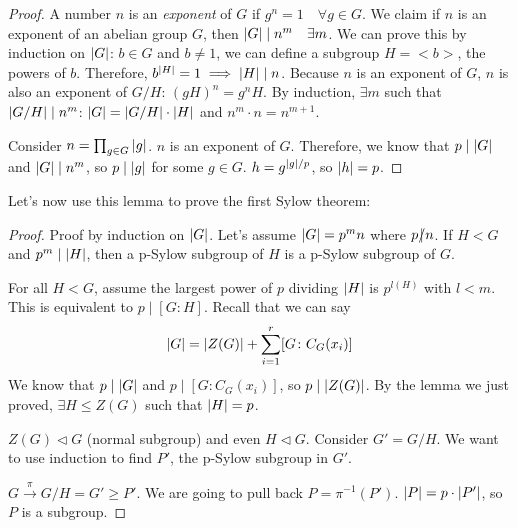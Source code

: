 \documentclass[a4paper,twoside,master.tex]{subfiles}
\begin{document}
\begin{proof}
    A number $ n $ is an \textit{exponent} of $ G $ if $ g^n = 1 \quad\forall g \in G$. We claim if $ n $ is an exponent of an abelian group $ G $, then $ \abs{G} \mid n^m \quad\exists m $. We can prove this by induction on $ \abs{G} $: $ b \in G $ and $ b \neq 1 $, we can define a subgroup $ H = <b> $, the powers of $ b $. Therefore, $ b^{\abs{H}} = 1 \implies \abs{H} \mid n $. Because $ n $ is an exponent of $ G $, $ n $ is also an exponent of $ G/H $: $ (gH)^n = g^n H $. By induction, $ \exists m $ such that $ \abs{G/H} \mid n^m $: $ \abs{G} = \abs{G/H} \cdot \abs{H} $ and $ n^m \cdot n = n^{m+1} $.

    Consider $ n = \prod_{g \in G} \abs{g} $. $ n $ is an exponent of $ G $. Therefore, we know that $ p\mid \abs{G} $ and $ \abs{G} \mid n^m $, so $ p \mid \abs{g} $ for some $ g \in G $. $ h = g^{\abs{g} / p} $, so $ \abs{h} = p $.
\end{proof}

Let's now use this lemma to prove the first Sylow theorem:
\begin{proof}
    Proof by induction on $ \abs{G} $. Let's assume $ \abs{G} = p^m n $ where $ p \slashed{\mid} n $. If $ H < G $ and $ p^m \mid \abs{H} $, then a p-Sylow subgroup of $ H $ is a p-Sylow subgroup of $ G $.

    For all $ H < G $, assume the largest power of $ p $ dividing $ \abs{H} $ is $ p^{l(H)} $ with $ l < m $. This is equivalent to $ p\mid [G \colon H] $. Recall that we can say
    \begin{equation}
        \abs{G} = \abs{Z(G)} + \sum_{i = 1}^{r} [G \colon C_G(x_i)]
    \end{equation}
    We know that $ p \mid \abs{G} $ and $ p \mid [G \colon C_G(x_i)] $, so $ p \mid \abs{Z(G)} $. By the lemma we just proved, $ \exists H \leq Z(G) $ such that $ \abs{H} = p $.

    $ Z(G) \triangleleft G $ (normal subgroup) and even $ H \triangleleft G $. Consider $ G' = G/H $. We want to use induction to find $ P' $, the p-Sylow subgroup in $ G' $.

    $ G \xrightarrow{\pi} G/H = G' \geq P' $. We are going to pull back $ P = \pi^{-1}(P') $. $ \abs{P} = p \cdot \abs{P'} $, so $ P $ is a subgroup.
\end{proof}
\end{document}
